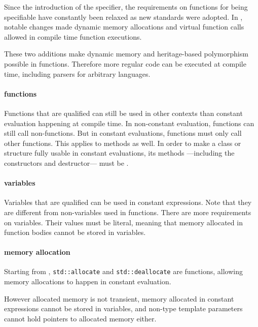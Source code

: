 \documentclass[../main]{subfiles}
\begin{document}
Since the introduction of the \constexpr specifier, the requirements on
functions for being \constexpr specifiable have constantly been relaxed as new
\cpp standards were adopted. In , notable changes made dynamic memory
allocations\cite{constexpr-memory} and virtual \constexpr function
calls\cite{virtual-constexpr} allowed in compile time \constexpr function
executions.

These two additions make dynamic memory and heritage-based polymorphism
possible in \constexpr functions. Therefore more regular \cpp code can be
executed at compile time, including parsers for arbitrary languages.

\paragraph{\constexpr functions} Functions that are \constexpr qualified can
still be used in other contexts than constant evaluation happening at
compile time. In non-constant evaluation, \constexpr functions can still call
non-\constexpr functions. But in constant evaluations, \constexpr functions must
only call other \constexpr functions. This applies to methods as well.
In order to make a \cpp class or structure fully usable in constant evaluations,
its methods ---including the constructors and destructor--- must be \constexpr.

\paragraph{\constexpr variables} Variables that are \constexpr qualified can be
used in constant expressions. Note that they are different from
non-\constexpr variables used in \constexpr functions.
There are more requirements on \constexpr variables.
Their values must be literal, meaning that memory allocated in \constexpr
function bodies cannot be stored in \constexpr variables.

\paragraph{\constexpr memory allocation} Starting from ,
\lstinline{std::allocate} and \lstinline{std::deallocate} are \constexpr
functions, allowing memory allocations to happen in constant evaluation.

However \constexpr allocated memory is not transient, \ie memory allocated in
constant expressions cannot be stored in \constexpr variables, and non-type
template parameters cannot hold pointers to \constexpr allocated memory either.
\end{document}
